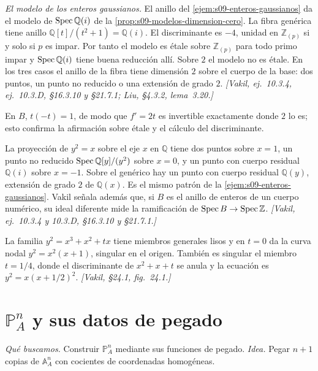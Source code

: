 \emph{El modelo de los enteros gaussianos.} El anillo del \cref{ejem:s09-enteros-gaussianos} da el modelo de $\operatorname{Spec}\mathbb Q(i)$ de la \cref{prop:s09-modelos-dimension-cero}. La fibra genérica tiene anillo $\mathbb Q[t]/(t^2+1)=\mathbb Q(i)$. El discriminante es $-4$, unidad en $\mathbb Z_{(p)}$ si y solo si $p$ es impar. Por tanto el modelo es étale sobre $\mathbb Z_{(p)}$ para todo primo impar y $\operatorname{Spec}\mathbb Q(i)$ tiene buena reducción allí. Sobre $2$ el modelo no es étale. En los tres casos el anillo de la fibra tiene dimensión $2$ sobre el cuerpo de la base: dos puntos, un punto no reducido o una extensión de grado $2$. \emph{[Vakil, ej.~10.3.4, ej.~10.3.D, \S16.3.10 y \S21.7.1; Liu, \S4.3.2, lema~3.20.]}


En $B$, $t(-t)=1$, de modo que $f'=2t$ es invertible exactamente donde $2$ lo es; esto confirma la afirmación sobre étale y el cálculo del discriminante.

\begin{obs}
\label{obs:s09-parabola-vakil}
La proyección de $y^2=x$ sobre el eje $x$ en $\mathbb Q$ tiene dos puntos sobre $x=1$, un punto no reducido $\operatorname{Spec}\mathbb Q[y]/(y^2)$ sobre $x=0$, y un punto con cuerpo residual $\mathbb Q(i)$ sobre $x=-1$. Sobre el genérico hay un punto con cuerpo residual $\mathbb Q(y)$, extensión de grado $2$ de $\mathbb Q(x)$. Es el mismo patrón de la \cref{ejem:s09-enteros-gaussianos}. Vakil señala además que, si $B$ es el anillo de enteros de un cuerpo numérico, su ideal diferente mide la ramificación de $\operatorname{Spec} B\to\operatorname{Spec}\mathbb Z$. \emph{[Vakil, ej.~10.3.4 y 10.3.D, \S16.3.10 y \S21.7.1.]}
\end{obs}

\begin{obs}
\label{obs:s09-degeneracion-nodo}
La familia $y^2=x^3+x^2+tx$ tiene miembros generales lisos y en $t=0$ da la curva nodal $y^2=x^2(x+1)$, singular en el origen. También es singular el miembro $t=1/4$, donde el discriminante de $x^2+x+t$ se anula y la ecuación es $y^2=x(x+1/2)^2$. \emph{[Vakil, \S24.1, fig.~24.1.]}
\end{obs}

\section{\texorpdfstring{$\mathbb P^n_A$}{PnA} y sus datos de pegado}
\emph{Qué buscamos.} Construir $\mathbb P^n_A$ mediante sus funciones de pegado. \emph{Idea.} Pegar $n+1$ copias de $\mathbb A^n_A$ con cocientes de coordenadas homogéneas.

